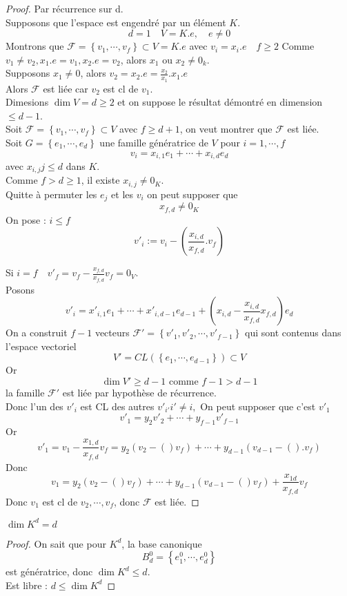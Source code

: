 \documentclass[../main.tex]{subfiles}
\begin{document}
\begin{proof}
Par récurrence sur d.\\
Supposons que l'espace est engendré par un élément $K$.
\[ 
d=1 \quad V= K.e,\quad e\neq 0
\]
Montrons que $ \mathcal{F} = \left\{ v_1, \cdots, v_f \right\} \subset V = K.e$ avec $ v_i = x_i .e \quad f\geq 2$
Comme $v_1 \neq v_2, x_1.e = v_1, x_2.e = v_2$, alors $x_1$ ou $x_2 \neq 0_k$.\\
Supposons $x_1\neq 0$, alors $v_2= x_2.e = \frac{x_2}{x_1}.x_1.e$ \\
Alors $\mathcal{F}$ est liée car $v_2$ est cl de $v_1$.\\
Dimesions $\dim V = d \geq 2$ et on suppose le résultat démontré en dimension $\leq d-1$.\\
Soit $\mathcal{F}= \left\{ v_1,\cdots, v_f \right\} \subset V$ avec $f \geq d+1$, on veut montrer que $\mathcal{F}$ est liée.\\
Soit $G= \left\{ e_1,\cdots, e_d \right\} $ une famille génératrice de $V$ pour $i= 1,\cdots, f$ 
\[ 
v_i = x_{i,1} e_1 + \cdots + x_{i,d} e_d
\]
avec $x_{i,j} j\leq d$ dans $K$.\\
Comme $f> d\geq 1$, il existe $x_{i,j} \neq 0_K$.\\
Quitte à permuter les $e_j$ et les $v_i$ on peut supposer que
\[ 
x_{f,d}  \neq 0_K
\]
On pose : $i\leq f$
\[ 
v'_i  := v_i - \left( \frac{ x_{i,d}  }{x_{f,d} }. v_f \right) 
\]

Si $i=f\quad v'_f = v_f - \frac{x_{f,d} }{x_{f,d} }v_f = 0_V$.\\
Posons 
\[ 
	v'_i = x'_{i,1} e_1 + \cdots + x'_{i,d-1} e_{d-1}  + ( x_{i,d} - \frac{x_{i,d} }{x_{f,d} }x_{f,d}  ) e_d
\]
On a construit $f-1$ vecteurs $\mathcal{F}' =\left\{ v'_1, v'_2,\cdots, v'_{f-1}  \right\} $ qui sont contenus dans l'espace vectoriel
\[ 
	V' = CL ( \left\{ e_1,\cdots, e_{d-1}  \right\} ) \subset V
\]
Or
\[ 
\dim V' \geq d-1 \text{ comme  } f-1 > d-1
\]
la famille $\mathcal{F}'$ est liée par hypothèse de récurrence.\\
Donc l'un des $v'_i$ est CL des autres $v'_{i'} i' \neq i, $ 
On peut supposer que c'est $v'_1$ 
\[ 
	v'_1 = y_2 v'_2 + \cdots + y_{f-1} v'_{f-1} 
\]
Or
\[ 
	v'_1 = v_1 - \frac{x_{1,d} }{x_{f,d} }v_f = y_2 ( v_2 - ( ) v_f) + \cdots + y_{d-1} ( v_{d-1} - (  ) .v_f) 
\]
Donc
\[ 
	v_1 = y_2 (  v_2 - ( ) v_f) + \cdots + y_{d-1} ( v_{d-1} - ( ) v_f)  + \frac{x_{1d} }{x_{f,d} }v_f 
\]
Donc $v_1$ est cl de $v_2, \cdots, v_f$, donc $\mathcal{F}$ est liée.



\end{proof}
\begin{crly}
$\dim K^{d}= d$
\end{crly}
\begin{proof}
On sait que pour $K^{d}$, la base canonique 
\[ 
B_{d} ^{0}= \left\{ e_1^{0}, \cdots, e_{d} ^{0} \right\}  
\]
est génératrice, donc $\dim K^{d}\leq d$.\\
Est libre : $d \leq \dim K^{d}$
\end{proof}
\end{document}

